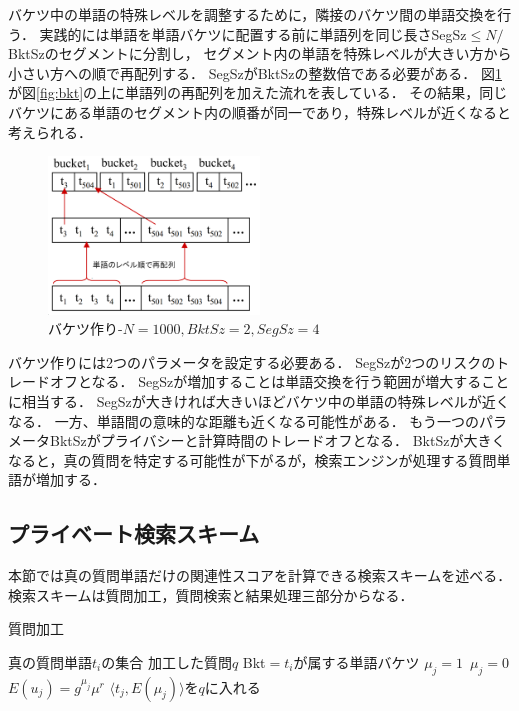 \documentclass[master]{suribt}
\theoremstyle{definition}
\begin{document}
 バケツ中の単語の特殊レベルを調整するために，隣接のバケツ間の単語交換を行う．
 実践的には単語を単語バケツに配置する前に単語列を同じ長さSegSz$\leq N/$BktSzのセグメントに分割し，
 セグメント内の単語を特殊レベルが大きい方から小さい方への順で再配列する．
 SegSzがBktSzの整数倍である必要がある．
 図\ref{fig:bkt2}が図\ref{fig:bkt}の上に単語列の再配列を加えた流れを表している．
 その結果，同じバケツにある単語のセグメント内の順番が同一であり，特殊レベルが近くなると考えられる．

 \begin{figure}
  \centering
  \includegraphics[width=0.5\textwidth,height=0.3\textwidth,natwidth=1600,natheight=1196]{rk13.png}
  \caption{バケツ作り-$N=1000,BktSz=2,SegSz=4$}\label{fig:bkt2}
 \end{figure}

 バケツ作りには2つのパラメータを設定する必要ある．
 SegSzが2つのリスクのトレードオフとなる．
 SegSzが増加することは単語交換を行う範囲が増大することに相当する．
 SegSzが大きければ大きいほどバケツ中の単語の特殊レベルが近くなる．
 一方、単語間の意味的な距離も近くなる可能性がある．
 もう一つのパラメータBktSzがプライバシーと計算時間のトレードオフとなる．
 BktSzが大きくなると，真の質問を特定する可能性が下がるが，検索エンジンが処理する質問単語が増加する．
 
 \subsection{プライベート検索スキーム}
 本節では真の質問単語だけの関連性スコアを計算できる検索スキームを述べる．
 検索スキームは質問加工，質問検索と結果処理三部分からなる．

 \begin{algorithm}
 \caption{質問加工}
 \begin{algorithmic}[1]
  \Require 真の質問単語$t_i$の集合
  \Ensure 加工した質問$q$
   \State Bkt$=t_i$が属する単語バケツ
     $\mu_j=1$
    \Else $\,\mu_j=0$
    \EndIf
    \State $E(u_j) = g^{\mu_j}\mu^r$
    \State $\langle t_j,E(\mu_j)\rangle$を$q$に入れる
   \EndFor
  \EndFor
 \EndFunction
 \end{algorithmic}
 \label{a:qe}
 \end{algorithm}
\end{document}
